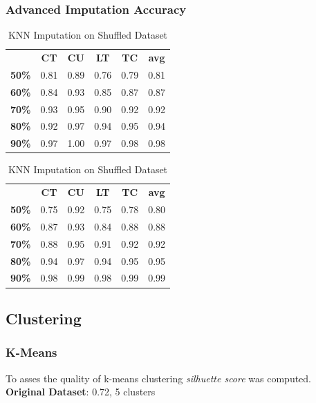 \documentclass{article}
\begin{document}
\subsubsection{Advanced Imputation Accuracy}
\begin{table}[h]
\begin{minipage}{.45\textwidth}\centering
\begin{tabular}{cccccc}
			  & \textbf{CT} & \textbf{CU} & \textbf{LT} & \textbf{TC} & \textbf{avg} \\
\textbf{50\%} & 0.81        & 0.89        & 0.76        & 0.79        & 0.81 \\
\textbf{60\%} & 0.84        & 0.93        & 0.85        & 0.87        & 0.87 \\
\textbf{70\%} & 0.93        & 0.95        & 0.90        & 0.92        & 0.92 \\
\textbf{80\%} & 0.92        & 0.97        & 0.94        & 0.95        & 0.94 \\
\textbf{90\%} & 0.97        & 1.00        & 0.97        & 0.98        & 0.98
\end{tabular}
\caption{KNN Imputation}
\end{minipage}
\hfill
\begin{minipage}{.5\textwidth}\centering
\begin{tabular}{cccccc}
			  & \textbf{CT} & \textbf{CU} & \textbf{LT} & \textbf{TC} & \textbf{avg} \\
\textbf{50\%} & 0.75        & 0.92        & 0.75        & 0.78        & 0.80 \\
\textbf{60\%} & 0.87        & 0.93        & 0.84        & 0.88        & 0.88 \\
\textbf{70\%} & 0.88        & 0.95        & 0.91        & 0.92        & 0.92 \\
\textbf{80\%} & 0.94        & 0.97        & 0.94        & 0.95        & 0.95 \\
\textbf{90\%} & 0.98        & 0.99        & 0.98        & 0.99        & 0.99
\end{tabular}
\caption{KNN Imputation on Shuffled Dataset}
\end{minipage}
\end{table}

\subsection{Clustering}
\subsubsection{K-Means}
To asses the quality of k-means clustering \emph{silhuette score} was computed.\\
\textbf{Original Dataset}: 0.72, 5 clusters
\end{document}
